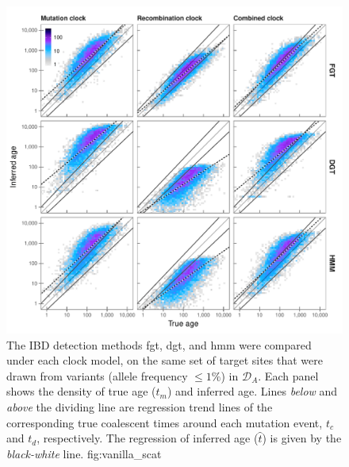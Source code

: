 

\begin{figure}[p]
\includegraphics[width=\textwidth]{./img/ch5/vanilla_scat}
{The  IBD detection methods \gls{fgt}, \gls{dgt}, and \gls{hmm} were compared under each clock model, on the same set of target sites that were drawn from \fk{[2,20]} variants (allele frequency ${\leq 1\%}$) in $\mathcal{D}_A$.
Each panel shows the density of true age ($t_m$) and inferred age.
Lines \emph{below} and \emph{above} the dividing line are regression trend lines of the corresponding true coalescent times around each mutation event, $t_c$ and $t_d$, respectively.
The regression of inferred age ($\hat{t}$) is given by the \emph{black-white} line.}
{fig:vanilla_scat}
\end{figure}
